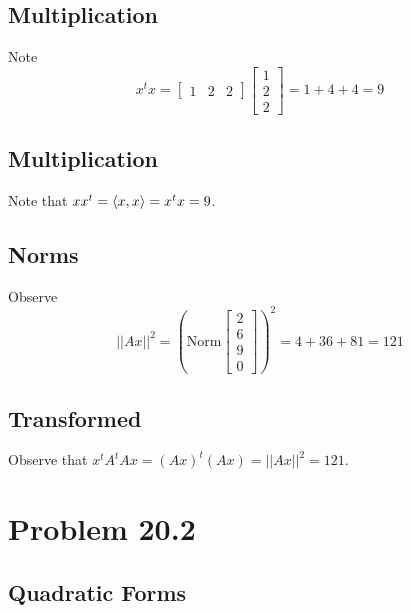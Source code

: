 \documentclass{article}
\theoremstyle{named}
\begin{document}
\subsection{Multiplication}

Note
\[
    x^t x = \begin{bmatrix} 1 & 2 & 2 \end{bmatrix} \begin{bmatrix} 1 \\ 2 \\ 2 \end{bmatrix} = 1 + 4 + 4 = 9
\]

\subsection{Multiplication}

Note that $x x^t = \braket{x, x} = x^t x = 9$. 

\subsection{Norms}

Observe
\[
    ||Ax||^2 = \left(\text{Norm} \begin{bmatrix} 2 \\ 6 \\ 9 \\ 0 \end{bmatrix}\right) ^2  = 4 + 36 + 81 = 121
\]

\subsection{Transformed}

Observe that $x^t A^t Ax = (Ax)^t (Ax) = ||Ax||^2 = 121$.

\section{Problem 20.2}

\subsection{Quadratic Forms}
\end{document}
